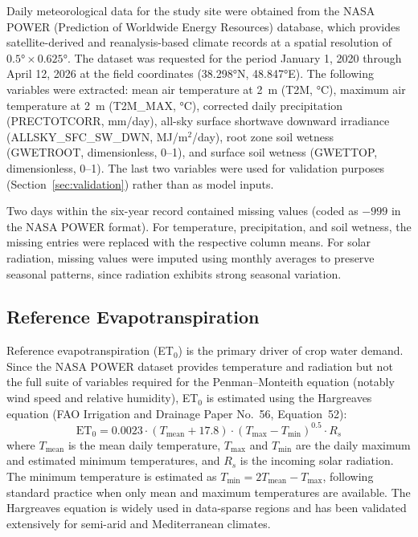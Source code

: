 Daily meteorological data for the study site were obtained from the NASA POWER (Prediction of Worldwide Energy Resources) database, which provides satellite-derived and reanalysis-based climate records at a spatial resolution of $0.5° \times 0.625°$. The dataset was requested for the period January 1, 2020 through April 12, 2026 at the field coordinates (38.298°N, 48.847°E). The following variables were extracted: mean air temperature at 2~m (T2M, °C), maximum air temperature at 2~m (T2M\_MAX, °C), corrected daily precipitation (PRECTOTCORR, mm/day), all-sky surface shortwave downward irradiance (ALLSKY\_SFC\_SW\_DWN, MJ/m$^2$/day), root zone soil wetness (GWETROOT, dimensionless, 0--1), and surface soil wetness (GWETTOP, dimensionless, 0--1). The last two variables were used for validation purposes (Section~\ref{sec:validation}) rather than as model inputs.

Two days within the six-year record contained missing values (coded as $-999$ in the NASA POWER format). For temperature, precipitation, and soil wetness, the missing entries were replaced with the respective column means. For solar radiation, missing values were imputed using monthly averages to preserve seasonal patterns, since radiation exhibits strong seasonal variation.


\subsection{Reference Evapotranspiration}
\label{sec:et0}

Reference evapotranspiration (ET$_0$) is the primary driver of crop water demand. Since the NASA POWER dataset provides temperature and radiation but not the full suite of variables required for the Penman--Monteith equation (notably wind speed and relative humidity), ET$_0$ is estimated using the Hargreaves equation (FAO Irrigation and Drainage Paper No.~56, Equation~52):
\begin{equation}
    \text{ET}_0 = 0.0023 \cdot (T_{\text{mean}} + 17.8) \cdot (T_{\max} - T_{\min})^{0.5} \cdot R_s
    \label{eq:et0}
\end{equation}
where $T_{\text{mean}}$ is the mean daily temperature, $T_{\max}$ and $T_{\min}$ are the daily maximum and estimated minimum temperatures, and $R_s$ is the incoming solar radiation. The minimum temperature is estimated as $T_{\min} = 2T_{\text{mean}} - T_{\max}$, following standard practice when only mean and maximum temperatures are available. The Hargreaves equation is widely used in data-sparse regions and has been validated extensively for semi-arid and Mediterranean climates.


